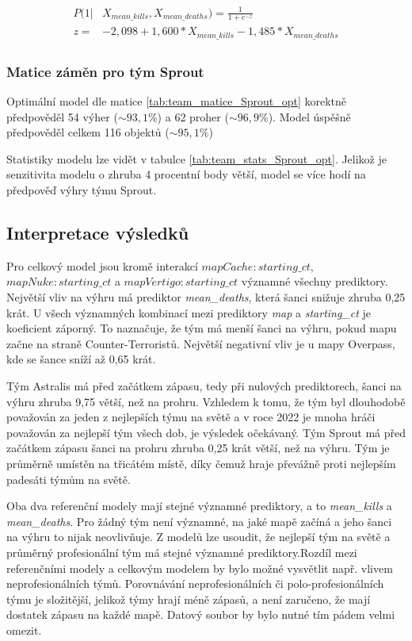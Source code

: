 \begin{align*}
    \begin{split}
        P(1 | &X_{mean\_kills},  X_{mean\_deaths}) = \frac{1}{1 + e^{-z}} \\
        z = &-2,098 + 1,600*X_{mean\_kills} - 1,485*X_{mean\_deaths}
    \end{split}
\end{align*}

\subsubsection{Matice záměn pro tým Sprout}



Optimální model dle matice \ref{tab:team_matice_Sprout_opt} korektně předpověděl 54 výher ($\sim 93,1 \%$) a 62 proher ($\sim 96,9 \%$). Model úspěšně předpověděl
celkem 116 objektů ($\sim 95,1 \%$)



Statistiky modelu lze vidět v tabulce \ref{tab:team_stats_Sprout_opt}. Jelikož je senzitivita modelu o zhruba 4 procentní body větší,
model se více hodí na předpověď výhry týmu Sprout.

\subsection{Interpretace výsledků}
Pro celkový model jsou kromě interakcí $mapCache:starting\_ct$, $mapNuke:starting\_ct$ a $mapVertigo:starting\_ct$ významné všechny prediktory. Největší vliv na výhru má
prediktor \textit{mean\_deaths}, která šanci snižuje zhruba 0,25 krát. U všech významných kombinací mezi prediktory \textit{map} a \textit{starting\_ct} je koeficient
záporný. To naznačuje, že tým má menší šanci na výhru, pokud mapu začne na straně Counter-Terroristů. Největší negativní vliv je u mapy Overpass, kde se šance
sníží až 0,65 krát.

Tým Astralis má před začátkem zápasu, tedy při nulových prediktorech, šanci na výhru zhruba 9,75 větší, než na prohru. Vzhledem k tomu, že tým byl dlouhodobě považován
za jeden z nejlepších týmu na světě a v roce 2022 je mnoha hráči považován za nejlepší tým všech dob, je výsledek očekávaný. Tým Sprout má před začátkem zápasu 
šanci na prohru zhruba 0,25 krát větší, než na výhru. Tým je průměrně umístěn na třicátém místě, díky čemuž hraje převážně proti nejlepším padesáti týmům na světě.

Oba dva referenční modely mají stejné významné prediktory, a to \textit{mean\_kills} a \textit{mean\_deaths}. Pro žádný tým není významné, na jaké mapě začíná a jeho šanci
na výhru to nijak neovlivňuje. Z modelů lze usoudit, že nejlepší tým na světě a průměrný profesionální tým má stejné významné prediktory.Rozdíl mezi referenčními modely a 
celkovým modelem by bylo možné vysvětlit např. vlivem neprofesionálních týmů. Porovnávání neprofesionálních či polo-profesionálních týmu je složitější, jelikož týmy 
hrají méně zápasů, a není zaručeno, že mají dostatek zápasu na každé mapě. Datový soubor by bylo nutné tím pádem velmi omezit.
